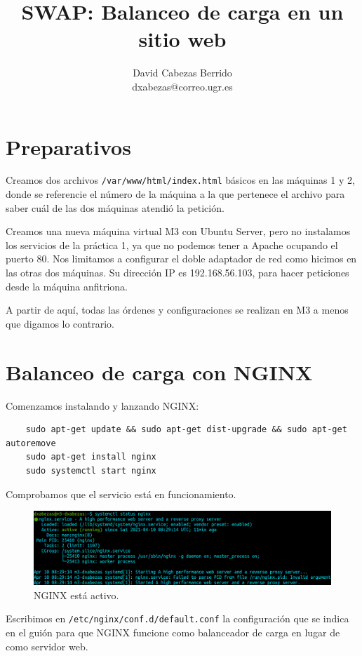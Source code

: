 \documentclass{article}
\title{\Huge SWAP: Balanceo de carga en un sitio web\vspace{10mm}}
\author{\huge David Cabezas Berrido \vspace{10mm} \\ 
  \huge dxabezas@correo.ugr.es \vspace{10mm}}
\begin{document}
\maketitle
\tableofcontents
\newpage

\section{Preparativos}

Creamos dos archivos \texttt{/var/www/html/index.html} básicos en las máquinas 1 y 2, donde se referencie el número de la máquina a la que
pertenece el archivo para saber cuál de las dos máquinas atendió la petición.

Creamos una nueva máquina virtual M3 con Ubuntu Server, pero no instalamos los servicios de la práctica 1, ya que no podemos
tener a Apache ocupando el puerto 80. Nos limitamos a configurar el doble
adaptador de red como hicimos en las otras dos máquinas. Su dirección IP es 192.168.56.103, para hacer peticiones desde la
máquina anfitriona.

A partir de aquí, todas las órdenes y configuraciones se realizan en M3 a menos que digamos
lo contrario.

\section{Balanceo de carga con NGINX}

Comenzamos instalando y lanzando NGINX:

\begin{verbatim}
	sudo apt-get update && sudo apt-get dist-upgrade && sudo apt-get autoremove
	sudo apt-get install nginx
	sudo systemctl start nginx
\end{verbatim}

Comprobamos que el servicio está en funcionamiento.

\begin{figure}[H]
	\centering
	\includegraphics[width=148mm]{imgs/nginx-status}
	\caption{NGINX está activo.}
	\label{fig:nginx-status}
\end{figure}

Escribimos en \texttt{/etc/nginx/conf.d/default.conf} la configuración que se indica en el guión
para que NGINX funcione como balanceador de carga en lugar de como servidor web.
\end{document}
